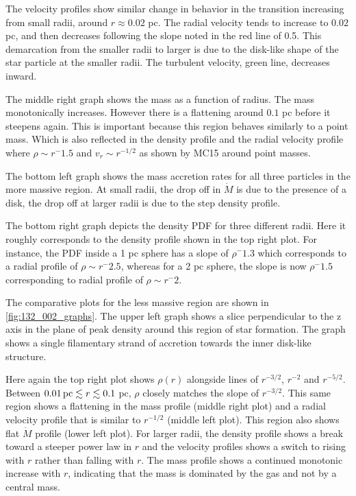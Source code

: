 \documentclass{emulateapj}
\begin{document}
The velocity profiles show similar change in behavior in the transition increasing from small radii, around $r\approx 0.02$ pc.  The radial velocity tends to increase to $0.02$ pc, and then decreases following the slope noted in the red line of 0.5.  This demarcation from the smaller radii to larger is due to the disk-like shape of the star particle at the smaller radii.  The turbulent velocity, green line, decreases inward.  

The middle right graph shows the mass as a function of radius.  The mass monotonically increases.  However there is a flattening around $0.1$ pc before it steepens again.  This is important because this region behaves similarly to a point mass.  Which is also reflected in the density profile and the radial velocity profile where $\rho \sim r^-1.5$ and $v_r \sim r^{-1/2}$ as shown by MC15 around point masses.  

The bottom left graph shows the mass accretion rates for all three particles in the more massive region.  At small radii, the drop off in $\dot M$ is due to the presence of a disk, the drop off at larger radii is due to the step density profile.  

The bottom right graph depicts the density PDF for three different radii.  Here it roughly corresponds to the density profile shown in the top right plot.  For instance, the PDF inside a 1 pc sphere has a slope of $\rho ^-1.3$ which corresponds to a radial profile of $\rho \sim r^-2.5$, whereas for a 2 pc sphere, the slope is now $\rho ^-1.5$ corresponding to radial profile of $\rho \sim r^-2$.  

The comparative plots for the less massive region are shown in \ref{fig:132_002_graphs}.  The upper left graph shows a slice perpendicular to the z axis in the plane of peak density around this region of star formation.  The graph shows a single filamentary strand of accretion towards the inner disk-like structure.  

Here again the top right plot shows $\rho(r)$ alongside lines of $r^{-3/2}$, $r^{-2}$ and $r^{-5/2}$.  Between $0.01\,{\rm pc} \lesssim r \lesssim 0.1$ pc, $\rho$ closely matches the slope of $r^{-3/2}$.  This same region shows a flattening in the mass profile (middle right plot) and a radial velocity profile that is similar to $r^{-1/2}$ (middle left plot).  This region also shows flat $\dot{M}$ profile (lower left plot).  For larger radii, the density profile shows a break toward a steeper power law in $r$ and the velocity profiles shows a switch to rising with $r$ rather than falling with $r$.  The mass profile shows a continued monotonic increase with $r$, indicating that the mass is dominated by the gas and not by a central mass.  
\end{document}
